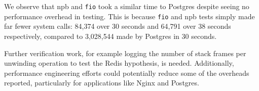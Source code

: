 We observe that \ac{npb} and \texttt{fio} took a similar time to Postgres
despite seeing no performance overhead in testing. This is because 
\texttt{fio} and \ac{npb} tests simply made far fewer system calls: 84,374 over
30 seconds and 64,791 over 38 seconds respectively, compared to 3,028,544 made 
by Postgres in 30 seconds.

Further verification work, for example logging the number of stack frames
per unwinding operation to test the Redis hypothesis, is needed. 
Additionally, performance engineering efforts could potentially reduce some of the
overheads reported, particularly for applications like Nginx and Postgres.
